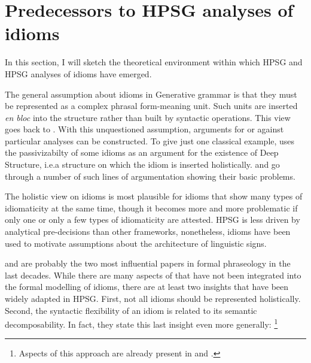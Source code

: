\documentclass[output=paper]{langsci/langscibook}
\begin{document}


\section{Predecessors to HPSG analyses of idioms}
\label{Sec-Predecessors}


In this section, I will sketch the theoretical environment within which HPSG and HPSG analyses of idioms have emerged.

The general assumption about idioms in Generative grammar is that they
must be represented as a complex phrasal form-meaning unit. 
Such units are inserted \emph{en bloc} into the structure rather than built by syntactic operations.
This view goes back to \cite[]{Chomsky:65}. 
With this unquestioned assumption, arguments for or against particular analyses can be constructed. 
To give just one classical example, \cite{Chomsky81a} uses the passivizabilty of some idioms as an argument for the existence of Deep Structure, i.e.\@ a structure on which the idiom is inserted holistically. 
%
\cite{Ruwet:91} and \cite{NSW94a} go through a number of such lines of argumentation showing their basic problems. 

The holistic view on idioms is most plausible for idioms that show many types of idiomaticity at the same time, though it becomes more and more problematic if only one or only a few types of idiomaticity are attested.
HPSG is less driven by analytical pre-decisions than other frameworks, nonetheless, idioms have been used to motivate assumptions about the architecture of linguistic signs.

\cite{WSN84a-u} and \cite{NSW94a} are probably the two most influential papers in formal phraseology in the last decades. 
While there are many aspects of \cite{NSW94a} that have not been integrated into the formal modelling of idioms, 
there are at least two insights that have been widely adapted in HPSG.
First, not all idioms should be represented holistically. 
Second, the syntactic flexibility of an idiom is related to its semantic decomposability. In fact, they state this last insight even more generally:%
\footnote{Aspects of this approach are already present in \cite{Higgins:74} and \cite{Newmeyer:74}.}
\end{document}
